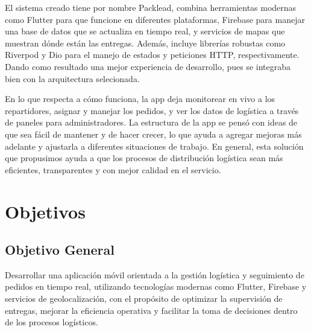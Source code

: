 \documentclass[11pt,letterpaper]{article}
\begin{document}
El sistema creado tiene por nombre Packlead, combina herramientas modernas como Flutter para que funcione en diferentes plataformas, Firebase para manejar una base de datos que se actualiza en tiempo real, y servicios de mapas que muestran dónde están las entregas. Además, incluye librerías robustas como Riverpod y Dio para el manejo de estados y peticiones HTTP, respectivamente. Dando como resultado una mejor experiencia de desarrollo, pues se integraba bien con la arquitectura selecionada.

En lo que respecta a cómo funciona, la app deja monitorear en vivo a los repartidores, asignar y manejar los pedidos, y ver los datos de logística a través de paneles para administradores. La estructura de la app se pensó con ideas de que sea fácil de mantener y de hacer crecer, lo que ayuda a agregar mejoras más adelante y ajustarla a diferentes situaciones de trabajo. En general, esta solución que propusimos ayuda a que los procesos de distribución logística sean más eficientes, transparentes y con mejor calidad en el servicio.
\newpage


\renewcommand{\contentsname}{Índice de Contenidos}
{\setlength{\parskip}{0pt}
\tableofcontents
}

\vspace{1.0cm}

\renewcommand{\listfigurename}{Índice de Ilustraciones}
{\setlength{\cftbeforefigskip}{2pt}
\listoffigures
}

\newpage


\section{Objetivos}
\subsection{Objetivo General}
Desarrollar una aplicación móvil orientada a la gestión logística y seguimiento de pedidos en tiempo real, utilizando tecnologías modernas como Flutter, Firebase y servicios de geolocalización, con el propósito de optimizar la supervisión de entregas, mejorar la eficiencia operativa y facilitar la toma de decisiones dentro de los procesos logísticos.
\end{document}

